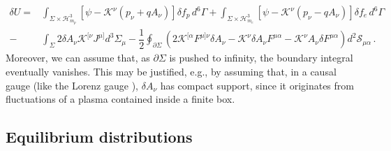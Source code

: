 \documentclass[a4paper, amsfonts, amssymb, amsmath, reprint, showkeys, nofootinbib, twoside, onecolumn,notitlepage]{revtex4-1}
\newcommand{\K}{{\mathcal{K}}}
\theoremstyle{definition}
\theoremstyle{theorem}
\begin{document}
\begin{equation}\label{laDU}
\begin{split}
\delta U ={}& \int_{\Sigma \times \mathcal{H}^3_{m_p}} \left[\psi-\K^\nu (p_\nu{+}qA_\nu)\right] \delta f_p\, d^6\Gamma +\int_{\Sigma \times \mathcal{H}^3_{m_e}} \left[\psi-\K^\nu (p_\nu{-}qA_\nu)\right]\delta  f_e\, d^6\Gamma \\
-{}& \int_\Sigma  2\delta A_\nu \K^{ [\nu}J^{\mu]} d^3\Sigma_\mu -\dfrac{1}{2}\oint_{\partial \Sigma} (2\K^{[\alpha} F^{\mu] \nu}  \delta A_\nu-\K^{\nu}  \delta A_\nu F^{\mu \alpha}-\K^{\nu} A_\nu \delta F^{\mu \alpha}) d^2 \mathcal{S}_{\mu \alpha} \, .
\end{split}
\end{equation}
Moreover, we can assume that, as $\partial \Sigma$ is pushed to infinity, the boundary integral eventually vanishes. This may be justified, e.g., by assuming that, in a causal gauge (like the Lorenz gauge \cite[\S 10.2]{Wald}), $\delta A_\nu$ has compact support, since it originates from fluctuations of a plasma contained inside a finite box.

\vspace{-0.3cm}
\subsection{Equilibrium distributions}
\vspace{-0.3cm}
\end{document}
